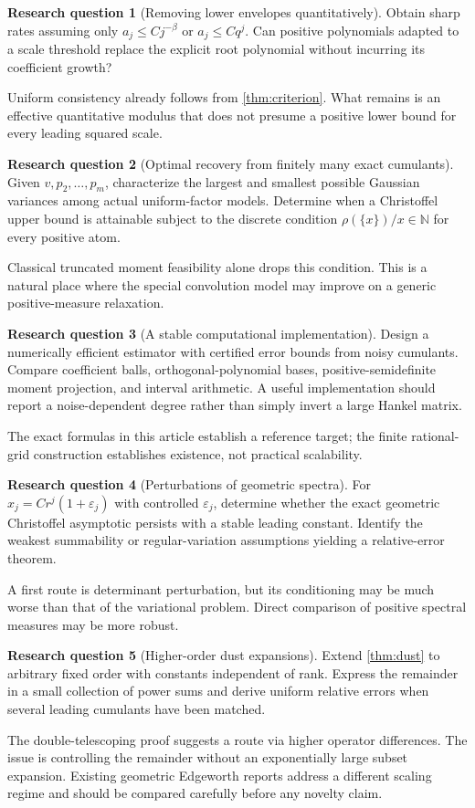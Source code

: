\documentclass[11pt,letterpaper]{article}
\numberwithin{equation}{section}
\theoremstyle{definition}
\newtheorem{question}{Research question}
\theoremstyle{remark}
\newcommand{\N}{\mathbb N}
\begin{document}
\begin{question}[Removing lower envelopes quantitatively]
Obtain sharp rates assuming only $a_j\le Cj^{-\beta}$ or $a_j\le Cq^j$.
Can positive polynomials adapted to a scale threshold replace the explicit
root polynomial without incurring its coefficient growth?
\end{question}
Uniform consistency already follows from \cref{thm:criterion}. What remains
is an effective quantitative modulus that does not presume a positive lower
bound for every leading squared scale.

\begin{question}[Optimal recovery from finitely many exact cumulants]
Given $v,p_2,\ldots,p_m$, characterize the largest and smallest possible
Gaussian variances among actual uniform-factor models. Determine when a
Christoffel upper bound is attainable subject to the discrete condition
$\rho(\{x\})/x\in\N$ for every positive atom.
\end{question}
Classical truncated moment feasibility alone drops this condition. This is a
natural place where the special convolution model may improve on a generic
positive-measure relaxation.

\begin{question}[A stable computational implementation]
Design a numerically efficient estimator with certified error bounds from
noisy cumulants. Compare coefficient balls, orthogonal-polynomial bases,
positive-semidefinite moment projection, and interval arithmetic. A useful
implementation should report a noise-dependent degree rather than simply
invert a large Hankel matrix.
\end{question}
The exact formulas in this article establish a reference target; the finite
rational-grid construction establishes existence, not practical scalability.

\begin{question}[Perturbations of geometric spectra]
For $x_j=Cr^j(1+\varepsilon_j)$ with controlled $\varepsilon_j$, determine
whether the exact geometric Christoffel asymptotic persists with a stable
leading constant. Identify the weakest summability or regular-variation
assumptions yielding a relative-error theorem.
\end{question}
A first route is determinant perturbation, but its conditioning may be much
worse than that of the variational problem. Direct comparison of positive
spectral measures may be more robust.

\begin{question}[Higher-order dust expansions]
Extend \cref{thm:dust} to arbitrary fixed order with constants independent of
rank. Express the remainder in a small collection of power sums and derive
uniform relative errors when several leading cumulants have been matched.
\end{question}
The double-telescoping proof suggests a route via higher operator differences.
The issue is controlling the remainder without an exponentially large subset
expansion. Existing geometric Edgeworth reports address a different scaling
regime and should be compared carefully before any novelty claim.
\end{document}

